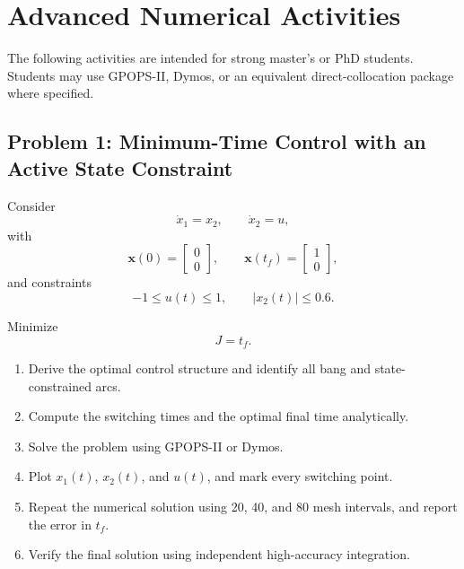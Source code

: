 \section{Advanced Numerical Activities}

The following activities are intended for strong master's or PhD students.
Students may use GPOPS-II, Dymos, or an equivalent direct-collocation package
where specified.

\subsection*{Problem 1: Minimum-Time Control with an Active State Constraint}

Consider
\begin{equation}
\dot{x}_1 = x_2,
\qquad
\dot{x}_2 = u,
\end{equation}
with
\begin{equation}
\mathbf{x}(0)=
\begin{bmatrix}
0\\
0
\end{bmatrix},
\qquad
\mathbf{x}(t_f)=
\begin{bmatrix}
1\\
0
\end{bmatrix},
\end{equation}
and constraints
\begin{equation}
-1 \leq u(t) \leq 1,
\qquad
|x_2(t)| \leq 0.6.
\end{equation}

Minimize
\begin{equation}
J=t_f.
\end{equation}

\begin{enumerate}
    \item Derive the optimal control structure and identify all bang and
    state-constrained arcs.
    
    \item Compute the switching times and the optimal final time analytically.
    
    \item Solve the problem using GPOPS-II or Dymos.
    
    \item Plot $x_1(t)$, $x_2(t)$, and $u(t)$, and mark every switching point.
    
    \item Repeat the numerical solution using 20, 40, and 80 mesh intervals,
    and report the error in $t_f$.
    
    \item Verify the final solution using independent high-accuracy integration.
\end{enumerate}


